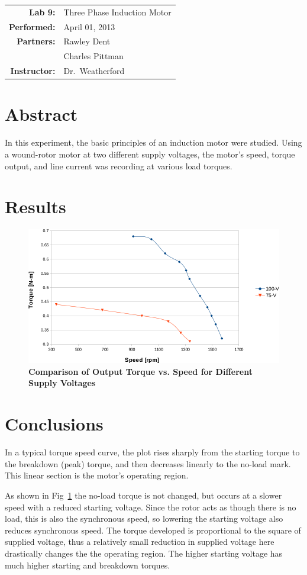 \documentclass{article}
\begin{document}
\begin{tabular}{rl}
  \textbf{Lab 9:} & Three Phase Induction Motor\\
  \textbf{Performed:} & April 01, 2013 \\
  \textbf{Partners:} & Rawley Dent \\ & Charles Pittman \\
  \textbf{Instructor:} & Dr.\ Weatherford
\end{tabular}


\section*{Abstract}
  In this experiment, the basic principles of an induction motor were studied.
  Using a wound-rotor motor at two different supply voltages, the motor's
  speed, torque output, and line current was recording at various load torques.

\section*{Results}
  \begin{figure}[H]
    \centering
    \includegraphics[width=\textwidth]{img/graph}
    \caption{\textbf{Comparison of Output Torque vs. Speed for Different Supply Voltages}}
    \label{fig:graph}
  \end{figure}

\section*{Conclusions}
  In a typical torque speed curve, the plot rises sharply from the starting
  torque to the breakdown (peak) torque, and then decreases linearly to the
  no-load mark. This linear section is the motor's operating region.

  As shown in Fig~\ref{fig:graph} the no-load torque is not changed, but occurs
  at a slower speed with a reduced starting voltage.  Since the rotor acts as
  though there is no load, this is also the synchronous speed, so lowering the
  starting voltage also reduces synchronous speed.  The torque developed is
  proportional to the square of supplied voltage, thus a relatively small
  reduction in supplied voltage here drastically changes the the operating
  region.  The higher starting voltage has much higher starting and breakdown
  torques.
\end{document}

